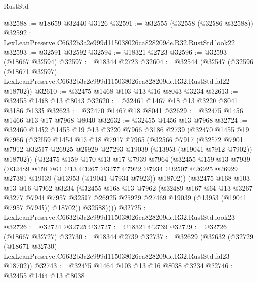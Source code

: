 \begin{lexlean}{RustStd}
\begin{coremodule}
@32588 := @18659 @32440 @3126
@32591 := @32555 (@32558 (@32586 @32588))
@32592 := LexLeanPreserve.C6632b3a2e999d115038026ca828209de.R32.RustStd.look22
@32593 := @32591 @32592
@32594 := @18321 @2723
@32596 := @32593 (@18667 @32594)
@32597 := @18344 @2723
@32604 := @32544
    (@32547
      (@32596
        (@18671 @32597)
        LexLeanPreserve.C6632b3a2e999d115038026ca828209de.R32.RustStd.fal22
        @18702))
@32610 := @32475 @1468 @103 @13 @16 @8043 @3234
@32613 := @32455 @1468 @13 @8043
@32620 := @32461 @1467 @18 @13 @3220 @8041 @3186 @1335
@32623 := @32470 @1467 @18 @8041
@32629 := @32475 @1456 @1466 @13 @17 @7968 @8040
@32632 := @32455 @1456 @13 @7968
@32724 := @32460
    @1452
    @1455
    @19
    @13
    @3220
    @7966
    @3186
    @2739
    (@32470
      @1455
      @19
      @7966
      (@32559
        @1454
        @13
        @18
        @7917
        @7965
        (@32566
          @7917
          (@32572
            @7901
            @7912
            @32507
            @26925
            @26929
            @27293
            @19039
            (@13953 (@19041 @7912 @7902))
            @18702))
        (@32475
          @159
          @170
          @13
          @17
          @7939
          @7964
          (@32455
            @159
            @13
            @7939
            (@32489
              @158
              @64
              @13
              @3267
              @3277
              @7922
              @7934
              @32507
              @26925
              @26929
              @27381
              @19039
              (@13953 (@19041 @7934 @7923))
              @18702))
          (@32475
            @168
            @103
            @13
            @16
            @7962
            @3234
            (@32455
              @168
              @13
              @7962
              (@32489
                @167
                @64
                @13
                @3267
                @3277
                @7944
                @7957
                @32507
                @26925
                @26929
                @27469
                @19039
                (@13953 (@19041 @7957 @7945))
                @18702))
            @32588))))
@32725 := LexLeanPreserve.C6632b3a2e999d115038026ca828209de.R32.RustStd.look23
@32726 := @32724 @32725
@32727 := @18321 @2739
@32729 := @32726 (@18667 @32727)
@32730 := @18344 @2739
@32737 := @32629
    (@32632
      (@32729
        (@18671 @32730)
        LexLeanPreserve.C6632b3a2e999d115038026ca828209de.R32.RustStd.fal23
        @18702))
@32743 := @32475 @1464 @103 @13 @16 @8038 @3234
@32746 := @32455 @1464 @13 @8038

\end{coremodule}
\end{lexlean}
